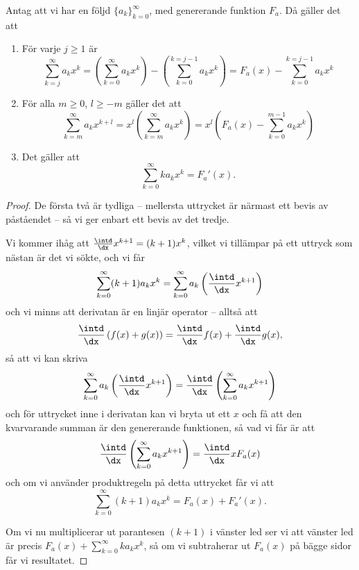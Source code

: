 \documentclass[nobib]{tufte-handout}
\begin{document}
\begin{lemma}\label{lemma_generating_function_calc_rules}
    Antag att vi har en följd $\{a_k\}_{k=0}^\infty$, med genererande funktion $F_a$. Då gäller det att
    \begin{enumerate}
        \item För varje $j \geq 1$ är
        $$\sum_{k = j}^{\infty} a_k x^k = \left(\sum_{k=0}^{\infty}a_k x^k\right) - \left(\sum_{k=0}^{k=j-1} a_kx^k\right) = F_a(x) - \sum_{k=0}^{k=j-1} a_kx^k$$
        \item För alla $m \geq 0$, $l \geq -m$ gäller det att
        $$\sum_{k=m}^{\infty} a_k x^{k + l} = x^l\left(\sum_{k=m}^{\infty} a_k x^{k}\right) = x^l\left(F_a(x) - \sum_{k=0}^{m-1} a_k x^k\right)$$
        \item Det gäller att
        $$\sum_{k=0}^{\infty} k a_k x^k = F_a'(x).$$
        
    \end{enumerate}
    \begin{proof}
        De första två är tydliga -- mellersta uttrycket är närmast ett bevis av påståendet -- så vi ger enbart ett bevis av det tredje.

        Vi kommer ihåg att $\frac{\intd}{\dx} x^{k+1} = (k+1)x^k$, vilket vi tillämpar på ett uttryck som nästan är det vi sökte, och vi får
        $$\sum_{k=0}^{\infty} (k + 1) a_k x^k = \sum_{k=0}^{\infty}a_k\left(\frac{\intd}{\dx} x^{k+1}\right)$$
        och vi minns att derivatan är en linjär operator -- alltså att 
        $$\frac{\intd}{\dx}\left(f(x) + g(x)\right) = \frac{\intd}{\dx}f(x) + \frac{\intd}{\dx} g(x),$$ 
        så att vi kan skriva
        $$\sum_{k=0}^{\infty}a_k\left(\frac{\intd}{\dx} x^{k+1}\right) = \frac{\intd}{\dx}\left(\sum_{k=0}^{\infty} a_k x^{k+1}\right)$$
        och för uttrycket inne i derivatan kan vi bryta ut ett $x$ och få att den kvarvarande summan är den genererande funktionen, så vad vi får är att
        $$\frac{\intd}{\dx}\left(\sum_{k=0}^{\infty} a_k x^{k+1}\right) = \frac{\intd}{\dx} xF_a(x)$$
        och om vi använder produktregeln på detta uttrycket får vi att
        $$\sum_{k=0}^{\infty} (k + 1) a_k x^k = F_a(x) + F_a'(x).$$

        Om vi nu multiplicerar ut parantesen $(k+1)$ i vänster led ser vi att vänster led är precis $F_a(x) + \sum_{k=0}^{\infty} k a_k x^k$, så om vi subtraherar ut $F_a(x)$ på bägge sidor får vi resultatet.
    \end{proof}
\end{lemma}
\end{document}
